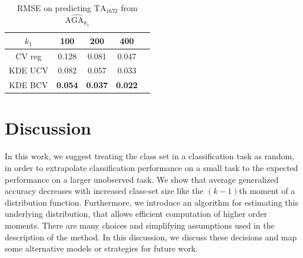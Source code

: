 \documentclass[twoside,11pt]{article}
\begin{document}
\begin{table}
\centering
\begin{tabular}{c||c|c|c|c}
\hline
$k_1$ & 100 & 200 & 400 \\\hline
CV reg & 0.128 & 0.081 & 0.047\\\hline
KDE UCV & 0.082 & 0.057 & 0.033 \\ \hline
KDE BCV & \textbf{0.054} & \textbf{0.037} & \textbf{0.022} \\\hline
\end{tabular}
\caption{RMSE on predicting $\text{TA}_{1672}$ from $\widehat{\text{AGA}_{k_1}}$}\label{tab:lfw_accuracy}
\end{table}


\section{Discussion}
\label{sec:discussion}
In this work, we suggest treating the class set in a classification
task as random, in order to extrapolate classification performance on
a small task to the expected performance on a larger unobserved task.
We show that average generalized accuracy decreases with increased
class-set size like the $(k-1)$th moment of a distribution function.
Furthermore, we introduce an algorithm for estimating this underlying
distribution, that allows efficient computation of higher order
moments.  There are many choices and simplifying assumptions used in
the description of the method.  In this discussion, we discuss these
decisions and map some alternative models or strategies for future
work.
\end{document}
